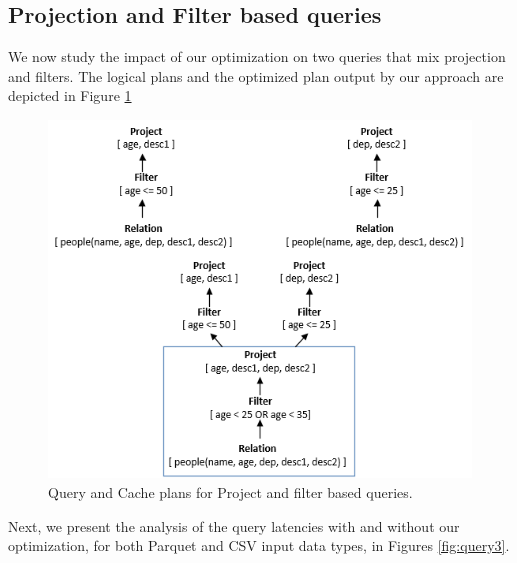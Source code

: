 \subsection{Projection and Filter based queries}
We now study the impact of our optimization on two queries that mix projection and filters. The logical plans and the optimized plan output by our approach are depicted in Figure \ref{fig:query3_plans}

\begin{figure}[!htb]
   \centering
   \includegraphics[scale=0.5]{figures/query3_cacheplan}
   \caption{Query and Cache plans for Project and filter based queries.} 
   \label{fig:query3_plans}
\end{figure}

Next, we present the analysis of the query latencies with and without our optimization, for both Parquet and CSV input data types, in Figures \ref{fig:query3}.

